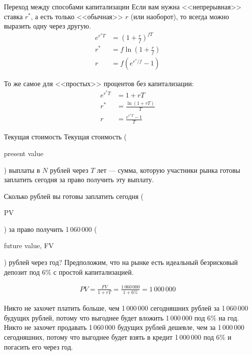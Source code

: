 \documentclass{beamer}
\newcommand{\en}[1]{\begin{otherlanguage}{english}#1\end{otherlanguage}}
\begin{document}
\begin{frame}{Переход между способами капитализации}
\justify
Если вам нужна <<непрерывная>> ставка $r^*$, а есть только <<обычная>> $r$ (или наоборот), то всегда можно выразить одну через другую.
\begin{align*}
e^{r^*T} &= \left(1 + \frac{r}{f}\right)^{fT} \\
r^* &= f\ln \left(1 + \frac{r}{f}\right) \\
r &= f\left(e^{r^*/f} - 1\right)
\end{align*}

\justify
То же самое для <<простых>> процентов без капитализации:
\begin{align*}
e^{r^*T} &= 1+rT \\
r^* &= \frac{\ln(1+rT)}{T} \\
r &= \frac{e^{r^*T}-1}{T}
\end{align*}

\end{frame}



\begin{frame}{Текущая стоимость}
\justify
\alert{Текущая стоимость} (\en{present value}) выплаты в $N$ рублей через $T$ лет --- сумма, 
которую участники рынка готовы заплатить сегодня за право получить эту выплату.

\justify
Сколько рублей вы готовы заплатить сегодня (\en{PV}) за право получить 1\,060\,000 (\en{future value, FV}) рублей через год? Предположим, что на рынке есть идеальный безрисковый депозит под 6\% с простой капитализацией.

\begin{align*}
PV = \frac{FV}{1+rT} = \frac{1\,060\,000}{1 + 6\%} = 1\,000\,000
\end{align*}

\justify
Никто не захочет платить больше, чем 1\,000\,000 сегодняшних рублей за 1\,060\,000 будущих рублей, потому что выгоднее будет вложить 1\,000\,000 под 6\% на год. Никто не захочет продавать 1\,060\,000 будущих рублей дешевле, чем за 1\,000\,000 сегодняшних, потому что выгоднее будет взять в кредит 1\,000\,000 под 6\% и погасить его через год.
\end{frame}
\end{document}
